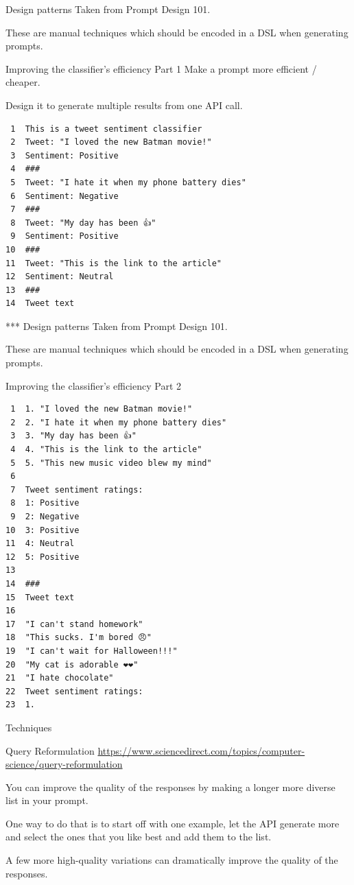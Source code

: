 \documentclass[presentation]{beamer}
\begin{document}
\begin{frame}[label={sec:org24a9a6c},fragile]{Design patterns}
 Taken from Prompt Design 101.

These are manual techniques which should be
encoded in a DSL when generating prompts.

\begin{block}{Improving the classifier’s efficiency Part 1}
Make a prompt more efficient / cheaper.

Design it to generate multiple results from
one API call.

{\footnotesize
\begin{verbatim}
 1  This is a tweet sentiment classifier
 2  Tweet: "I loved the new Batman movie!"
 3  Sentiment: Positive
 4  ###
 5  Tweet: "I hate it when my phone battery dies"
 6  Sentiment: Negative
 7  ###
 8  Tweet: "My day has been 👍"
 9  Sentiment: Positive
10  ###
11  Tweet: "This is the link to the article"
12  Sentiment: Neutral
13  ###
14  Tweet text
\end{verbatim}

}*** Design patterns
Taken from Prompt Design 101.

These are manual techniques which should be
encoded in a DSL when generating prompts.
\end{block}

\begin{block}{Improving the classifier’s efficiency Part 2}
{\footnotesize
\begin{verbatim}
 1  1. "I loved the new Batman movie!"
 2  2. "I hate it when my phone battery dies"
 3  3. "My day has been 👍"
 4  4. "This is the link to the article"
 5  5. "This new music video blew my mind"
 6  
 7  Tweet sentiment ratings:
 8  1: Positive
 9  2: Negative
10  3: Positive
11  4: Neutral
12  5: Positive
13  
14  ###
15  Tweet text
16  
17  "I can't stand homework"
18  "This sucks. I'm bored 😠"
19  "I can't wait for Halloween!!!"
20  "My cat is adorable ❤️❤️"
21  "I hate chocolate"
22  Tweet sentiment ratings:
23  1.
\end{verbatim}
}
\end{block}
\end{frame}

\begin{frame}[label={sec:org4c3c927}]{Techniques}
\begin{block}{Query Reformulation}
\url{https://www.sciencedirect.com/topics/computer-science/query-reformulation}

You can improve the quality of the responses
by making a longer more diverse list in your
prompt.

One way to do that is to start off with one
example, let the API generate more and select
the ones that you like best and add them to
the list.

A few more high-quality variations can
dramatically improve the quality of the
responses.
\end{block}
\end{frame}
\end{document}
